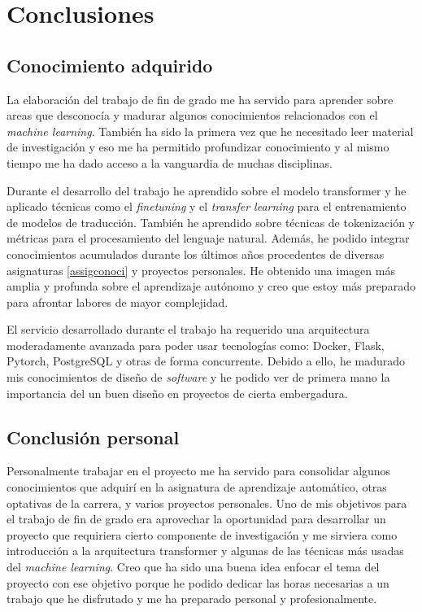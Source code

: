 \chapter{Conclusiones}
\section{Conocimiento adquirido}
La elaboración del trabajo de fin de grado me ha servido para aprender sobre areas que desconocía y madurar algunos conocimientos relacionados con el \textit{machine learning}. También ha sido la primera vez que he necesitado leer material de investigación y eso me ha permitido profundizar conocimiento y al mismo tiempo me ha dado acceso a la vanguardia de muchas disciplinas.

Durante el desarrollo del trabajo he aprendido sobre el modelo transformer y he aplicado técnicas como el \textit{finetuning} y el \textit{transfer learning} para el entrenamiento de modelos de traducción. También he aprendido sobre técnicas de tokenización y métricas para el procesamiento del lenguaje natural.
Además, he podido integrar conocimientos acumulados durante los últimos años procedentes de diversas asignaturas \ref{assigconoci} y proyectos personales. He obtenido una imagen más amplia y profunda sobre el aprendizaje autónomo y creo que estoy más preparado para afrontar labores de mayor complejidad.

El servicio desarrollado durante el trabajo ha requerido una arquitectura moderadamente avanzada para poder usar tecnologías como: Docker, Flask, Pytorch, PostgreSQL y otras de forma concurrente. Debido a ello, he madurado mis conocimientos de diseño de \textit{software} y he podido ver de primera mano la importancia del un buen diseño en proyectos de cierta embergadura.

\section{Conclusión personal}
Personalmente trabajar en el proyecto me ha servido para consolidar algunos conocimientos que adquirí en la asignatura de aprendizaje automático, otras optativas de la carrera, y varios proyectos personales. Uno de mis objetivos para el trabajo de fin de grado era aprovechar la oportunidad para desarrollar un proyecto que requiriera cierto componente de investigación y me sirviera como introducción a la arquitectura transformer y algunas de las técnicas más usadas del \textit{machine learning}. Creo que ha sido una buena idea enfocar el tema del proyecto con ese objetivo porque he podido dedicar las horas necesarias a un trabajo que he disfrutado y me ha preparado personal y profesionalmente.

